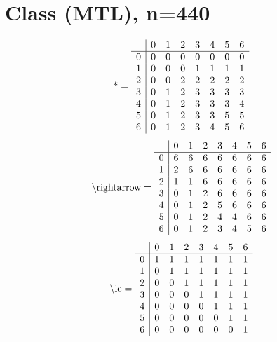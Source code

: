 \documentclass[11pt]{article}
\begin{document}
\section{Class (MTL), n=440}
\[\text{*} = 
\begin{array}{r | r r r r r r r}
 & 0 & 1 & 2 & 3 & 4 & 5 & 6 \\ \hline
0 & 0 & 0 & 0 & 0 & 0 & 0 & 0 \\
1 & 0 & 0 & 0 & 1 & 1 & 1 & 1 \\
2 & 0 & 0 & 2 & 2 & 2 & 2 & 2 \\
3 & 0 & 1 & 2 & 3 & 3 & 3 & 3 \\
4 & 0 & 1 & 2 & 3 & 3 & 3 & 4 \\
5 & 0 & 1 & 2 & 3 & 3 & 5 & 5 \\
6 & 0 & 1 & 2 & 3 & 4 & 5 & 6 \\
\end{array}
\]
\[\text{\textbackslash rightarrow} = 
\begin{array}{r | r r r r r r r}
 & 0 & 1 & 2 & 3 & 4 & 5 & 6 \\ \hline
0 & 6 & 6 & 6 & 6 & 6 & 6 & 6 \\
1 & 2 & 6 & 6 & 6 & 6 & 6 & 6 \\
2 & 1 & 1 & 6 & 6 & 6 & 6 & 6 \\
3 & 0 & 1 & 2 & 6 & 6 & 6 & 6 \\
4 & 0 & 1 & 2 & 5 & 6 & 6 & 6 \\
5 & 0 & 1 & 2 & 4 & 4 & 6 & 6 \\
6 & 0 & 1 & 2 & 3 & 4 & 5 & 6 \\
\end{array}
\]
\[\text{\textbackslash le} = 
\begin{array}{r | r r r r r r r}
 & 0 & 1 & 2 & 3 & 4 & 5 & 6 \\ \hline
0 & 1 & 1 & 1 & 1 & 1 & 1 & 1 \\
1 & 0 & 1 & 1 & 1 & 1 & 1 & 1 \\
2 & 0 & 0 & 1 & 1 & 1 & 1 & 1 \\
3 & 0 & 0 & 0 & 1 & 1 & 1 & 1 \\
4 & 0 & 0 & 0 & 0 & 1 & 1 & 1 \\
5 & 0 & 0 & 0 & 0 & 0 & 1 & 1 \\
6 & 0 & 0 & 0 & 0 & 0 & 0 & 1 \\
\end{array}
\]
\end{document}

